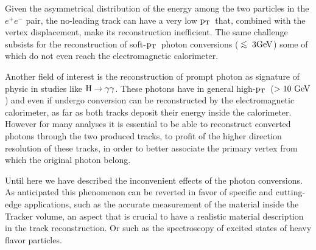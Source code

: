 \documentclass[a4paper]{jpconf}
\def\centeron#1#2{{\setbox0=\hbox{#1}\setbox1=\hbox{#2}\ifdim
\wd1>\wd0\kern.5\wd1\kern-.5\wd0\fi
\copy0\kern-.5\wd0\kern-.5\wd1\copy1\ifdim\wd0>\wd1
\kern.5\wd0\kern-.5\wd1\fi}}
\def\ltap{\;\centeron{\raise.35ex\hbox{$<$}}{\lower.65ex\hbox{$\sim$}}\;}
\def\lsim{\mathrel{\ltap}}
\def \pt{$\p_{\rm T}$~}
\begin{document}
Given the asymmetrical distribution of the energy among the two particles in the $e^+ e^-$ pair, the no-leading track can have a very low \pt that, combined with the vertex displacement, make its 
 reconstruction inefficient.
 The same challenge subsists for the reconstruction of soft-\pt photon conversions ($\rm \lsim 3 GeV$) some of which do not even reach the electromagnetic calorimeter.

Another field of interest is the reconstruction of prompt photon as signature of  physic in studies like $\rm H \to \gamma \gamma$.
These photons  have in general high-\pt ($\rm > 10~GeV$) and even if undergo conversion can be reconstructed by the electromagnetic calorimeter, as far as both tracks deposit their energy inside the calorimeter.
However for many analyses it is essential to be able to reconstruct  converted photons through the two produced tracks, to profit of the higher direction resolution of these tracks, in order to  better associate the primary vertex from which the original photon belong.  

Until here we have described the inconvenient effects of the photon conversions. As anticipated this phenomenon can be reverted in favor of specific and cutting-edge applications, such as the accurate measurement of the material inside the Tracker volume, an aspect that is crucial to have a realistic  material description in the track reconstruction. Or such as the spectroscopy of excited states of heavy flavor particles.  
\end{document}
